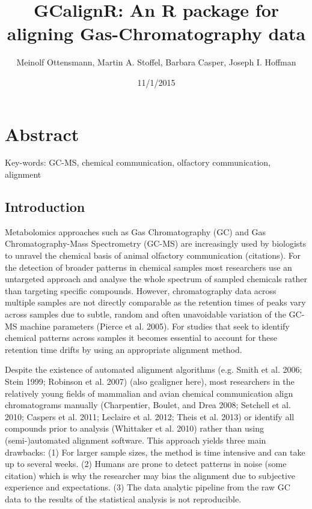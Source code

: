 \documentclass[]{article}
\title{GCalignR: An R package for aligning Gas-Chromatography data}
\author{Meinolf Ottensmann, Martin A. Stoffel, Barbara Casper, Joseph I. Hoffman}
\date{11/1/2015}
\begin{document}
\maketitle

\section{Abstract}\label{abstract}

Key-words: GC-MS, chemical communication, olfactory communication,
alignment

\subsection{Introduction}\label{introduction}

Metabolomics approaches such as Gas Chromatography (GC) and Gas
Chromatography-Mass Spectrometry (GC-MS) are increasingly used by
biologists to unravel the chemical basis of animal olfactory
communication (citations). For the detection of broader patterns in
chemical samples most researchers use an untargeted approach and analyse
the whole spectrum of sampled chemicals rather than targeting specific
compounds. However, chromatography data across multiple samples are not
directly comparable as the retention times of peaks vary across samples
due to subtle, random and often unavoidable variation of the GC-MS
machine parameters (Pierce et al. 2005). For studies that seek to
identify chemical patterns across samples it becomes essential to
account for these retention time drifts by using an appropriate
alignment method.

Despite the existence of automated alignment algorithms (e.g. Smith et
al. 2006; Stein 1999; Robinson et al. 2007) (also gcaligner here), most
researchers in the relatively young fields of mammalian and avian
chemical communication align chromatograms manually (Charpentier,
Boulet, and Drea 2008; Setchell et al. 2010; Caspers et al. 2011;
Leclaire et al. 2012; Theis et al. 2013) or identify all compounds prior
to analysis (Whittaker et al. 2010) rather than using (semi-)automated
alignment software. This approach yields three main drawbacks: (1) For
larger sample sizes, the method is time intensive and can take up to
several weeks. (2) Humans are prone to detect patterns in noise (some
citation) which is why the researcher may bias the alignment due to
subjective experience and expectations. (3) The data analytic pipeline
from the raw GC data to the results of the statistical analysis is not
reproducible.
\end{document}
